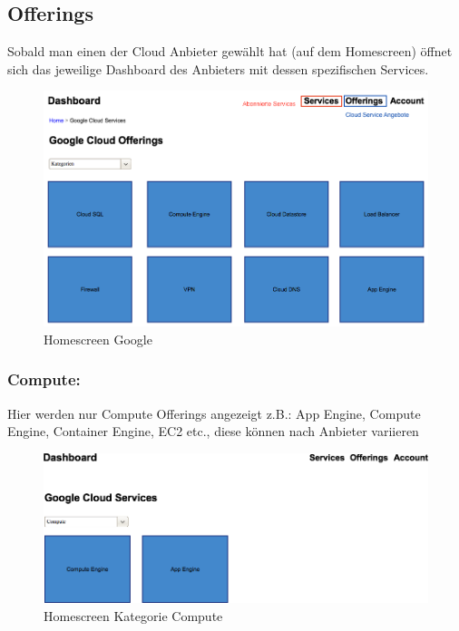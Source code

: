 \subsection{Offerings}
Sobald man einen der Cloud Anbieter gewählt hat (auf dem Homescreen) öffnet 
sich das jeweilige Dashboard des Anbieters mit dessen spezifischen Services.
\begin{figure}[!htbp]
  \includegraphics[width=\textwidth]{./03_Analyse/03_Dashboard/images/homescreen_google}
  \caption{Homescreen Google}
\end{figure}

\newpage

   \subsubsection{Compute:}
Hier werden nur Compute Offerings angezeigt z.B.: App Engine, Compute Engine, 
Container Engine, EC2 etc., diese können nach Anbieter variieren

\begin{figure}[!htbp]

   \includegraphics[width=\textwidth]{./03_Analyse/03_Dashboard/images/homescreen_google_compute}
   \caption{Homescreen Kategorie Compute}
\end{figure}
 

